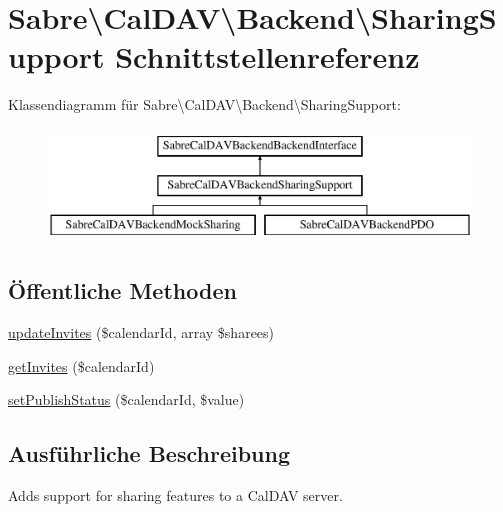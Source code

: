 \hypertarget{interface_sabre_1_1_cal_d_a_v_1_1_backend_1_1_sharing_support}{}\section{Sabre\textbackslash{}Cal\+D\+AV\textbackslash{}Backend\textbackslash{}Sharing\+Support Schnittstellenreferenz}
\label{interface_sabre_1_1_cal_d_a_v_1_1_backend_1_1_sharing_support}
Klassendiagramm für Sabre\textbackslash{}Cal\+D\+AV\textbackslash{}Backend\textbackslash{}Sharing\+Support\+:\begin{figure}[H]
\begin{center}
\leavevmode
\includegraphics[height=3.000000cm]{interface_sabre_1_1_cal_d_a_v_1_1_backend_1_1_sharing_support}
\end{center}
\end{figure}
\subsection*{Öffentliche Methoden}
\begin{DoxyCompactItemize}
\item 
\mbox{\hyperlink{interface_sabre_1_1_cal_d_a_v_1_1_backend_1_1_sharing_support_a1a8bd8b5909e5fb0e481e27b100d503e}{update\+Invites}} (\$calendar\+Id, array \$sharees)
\item 
\mbox{\hyperlink{interface_sabre_1_1_cal_d_a_v_1_1_backend_1_1_sharing_support_a82223ce074cb75008e420beda5df94c8}{get\+Invites}} (\$calendar\+Id)
\item 
\mbox{\hyperlink{interface_sabre_1_1_cal_d_a_v_1_1_backend_1_1_sharing_support_a890bbb111b3e3dc28716129d323fe25a}{set\+Publish\+Status}} (\$calendar\+Id, \$value)
\end{DoxyCompactItemize}


\subsection{Ausführliche Beschreibung}
Adds support for sharing features to a Cal\+D\+AV server.

